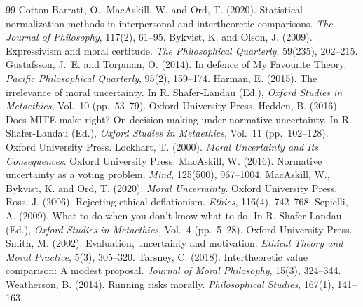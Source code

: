 \documentclass{situationist-preprint}
\begin{document}
\begin{thebibliography}{99}\small
{} Cotton-Barratt, O., MacAskill, W. and Ord, T. (2020). Statistical normalization methods in interpersonal and intertheoretic comparisons. \emph{The Journal of Philosophy}, 117(2), 61--95.
 Bykvist, K. and Olson, J. (2009). Expressivism and moral certitude. \emph{The Philosophical Quarterly}, 59(235), 202--215.
 Gustafsson, J.~E. and Torpman, O. (2014). In defence of My Favourite Theory. \emph{Pacific Philosophical Quarterly}, 95(2), 159--174.
 Harman, E. (2015). The irrelevance of moral uncertainty. In R. Shafer-Landau (Ed.), \emph{Oxford Studies in Metaethics}, Vol.~10 (pp.~53--79). Oxford University Press.
 Hedden, B. (2016). Does MITE make right? On decision-making under normative uncertainty. In R. Shafer-Landau (Ed.), \emph{Oxford Studies in Metaethics}, Vol.~11 (pp.~102--128). Oxford University Press.
 Lockhart, T. (2000). \emph{Moral Uncertainty and Its Consequences}. Oxford University Press.
 MacAskill, W. (2016). Normative uncertainty as a voting problem. \emph{Mind}, 125(500), 967--1004.
 MacAskill, W., Bykvist, K. and Ord, T. (2020). \emph{Moral Uncertainty}. Oxford University Press.
 Ross, J. (2006). Rejecting ethical deflationism. \emph{Ethics}, 116(4), 742--768.
 Sepielli, A. (2009). What to do when you don't know what to do. In R. Shafer-Landau (Ed.), \emph{Oxford Studies in Metaethics}, Vol.~4 (pp.~5--28). Oxford University Press.
 Smith, M. (2002). Evaluation, uncertainty and motivation. \emph{Ethical Theory and Moral Practice}, 5(3), 305--320.
 Tarsney, C. (2018). Intertheoretic value comparison: A modest proposal. \emph{Journal of Moral Philosophy}, 15(3), 324--344.
 Weatherson, B. (2014). Running risks morally. \emph{Philosophical Studies}, 167(1), 141--163.
\end{thebibliography}
\end{document}
